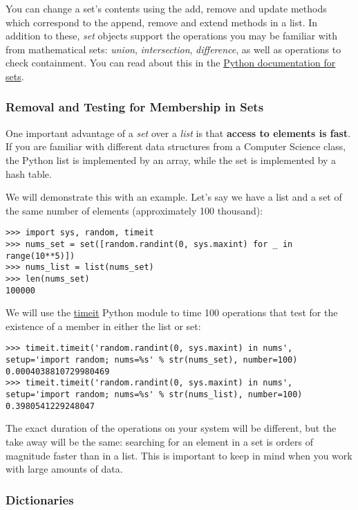 You can change a set's contents using the add, remove and update methods
which correspond to the append, remove and extend methods in a list. In
addition to these, \emph{set} objects support the operations you may be
familiar with from mathematical sets: \emph{union}, \emph{intersection},
\emph{difference}, as well as operations to check containment. You can
read about this in the
\href{https://docs.python.org/2/library/stdtypes.html\#set}{Python
documentation for sets}.

\subsubsection{Removal and Testing for Membership in
Sets}\label{removal-and-testing-for-membership-in-sets}

One important advantage of a \emph{set} over a \emph{list} is that
\textbf{access to elements is fast}. If you are familiar with different
data structures from a Computer Science class, the Python list is
implemented by an array, while the set is implemented by a hash table.

We will demonstrate this with an example. Let's say we have a list and a
set of the same number of elements (approximately 100 thousand):

\begin{verbatim}
>>> import sys, random, timeit
>>> nums_set = set([random.randint(0, sys.maxint) for _ in range(10**5)])
>>> nums_list = list(nums_set)
>>> len(nums_set)
100000
\end{verbatim}

We will use the
\href{https://docs.python.org/2/library/timeit.html}{timeit} Python
module to time 100 operations that test for the existence of a member in
either the list or set:

\begin{verbatim}
>>> timeit.timeit('random.randint(0, sys.maxint) in nums', setup='import random; nums=%s' % str(nums_set), number=100)
0.0004038810729980469
>>> timeit.timeit('random.randint(0, sys.maxint) in nums', setup='import random; nums=%s' % str(nums_list), number=100)
0.3980541229248047
\end{verbatim}

The exact duration of the operations on your system will be different,
but the take away will be the same: searching for an element in a set is
orders of magnitude faster than in a list. This is important to keep in
mind when you work with large amounts of data.

\subsubsection{Dictionaries}\label{dictionaries}

